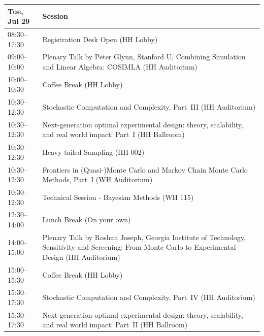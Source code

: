 \documentclass[12pt,lettersize,oneside]{book} %
\begin{document}
\begin{table}
{\footnotesize
\begin{tabularx}{\textwidth}{>{\hsize=0.32\hsize}X|>{\hsize=1.7\hsize}X}
\hline
\textbf{Tue, Jul 29} & \textbf{Session} \\
\hline
\cellcolor{\EmptyColor}08:30--17:30 & \cellcolor{\EmptyColor}Registration Desk Open (HH Lobby) \\
\cellcolor{\PlenaryColor}09:00--10:00 & \cellcolor{\PlenaryColor}Plenary Talk by Peter Glynn, Stanford U, Combining Simulation and Linear Algebra: COSIMLA (HH Auditorium) \\
\cellcolor{\EmptyColor}10:00--10:30 & \cellcolor{\EmptyColor}Coffee Break (HH Lobby) \\
\cellcolor{\SessionTitleColor}10:30--12:30 & \cellcolor{\SessionTitleColor}Stochastic Computation and Complexity, Part~III (HH Auditorium) \\
\cellcolor{\SessionTitleColor}10:30--12:30 & \cellcolor{\SessionTitleColor}Next-generation optimal experimental design: theory, scalability, and real world impact: Part~I (HH Ballroom) \\
\cellcolor{\SessionTitleColor}10:30--12:30 & \cellcolor{\SessionTitleColor}Heavy-tailed Sampling (HH 002) \\
\cellcolor{\SessionTitleColor}10:30--12:30 & \cellcolor{\SessionTitleColor}Frontiers in (Quasi-)Monte Carlo and Markov Chain Monte Carlo Methods, Part~I (WH Auditorium) \\
\cellcolor{\SessionLightColor}10:30--12:30 & \cellcolor{\SessionLightColor}Technical Session - Bayesian Methods (WH 115) \\
\cellcolor{\EmptyColor}12:30--14:00 & \cellcolor{\EmptyColor}Lunch Break (On your own) \\
\cellcolor{\PlenaryColor}14:00--15:00 & \cellcolor{\PlenaryColor}Plenary Talk by Roshan Joseph, Georgia Institute of Technology, Sensitivity and Screening: From Monte Carlo to Experimental Design (HH Auditorium) \\
\cellcolor{\EmptyColor}15:00--15:30 & \cellcolor{\EmptyColor}Coffee Break (HH Lobby) \\
\cellcolor{\SessionTitleColor}15:30--17:30 & \cellcolor{\SessionTitleColor}Stochastic Computation and Complexity, Part~IV (HH Auditorium) \\
\cellcolor{\SessionTitleColor}15:30--17:30 & \cellcolor{\SessionTitleColor}Next-generation optimal experimental design: theory, scalability, and real world impact: Part~II (HH Ballroom) \\

\end{tabularx}}
\end{table}
\end{document}
